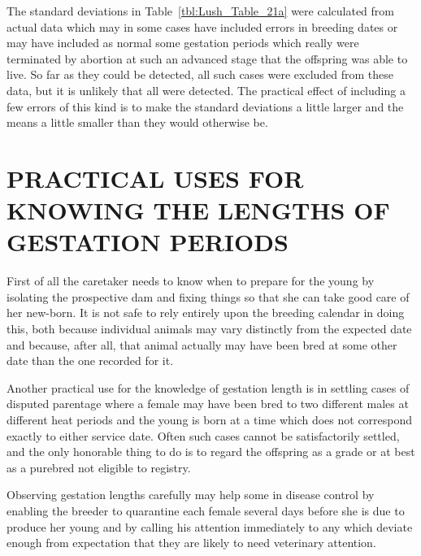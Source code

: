 The standard deviations in Table~\ref{tbl:Lush_Table_21a} were calculated
from actual data which may in some cases have included errors in breeding
dates or may have included as normal some gestation periods which really
were terminated by abortion at such an advanced stage that the offspring
was able to live. So far as they could be detected, all such cases
were excluded from these data, but it is unlikely that all were detected.
The practical effect of including a few errors of this kind is to make the
standard deviations a little larger and the means a little smaller than
they would otherwise be.

\section*{PRACTICAL USES FOR KNOWING THE LENGTHS OF GESTATION PERIODS}

First of all the caretaker needs to know when to prepare for the
young by isolating the prospective dam and fixing things so that she can
take good care of her new-born. It is not safe to rely entirely upon the
breeding calendar in doing this, both because individual animals may
vary distinctly from the expected date and because, after all, that animal
actually may have been bred at some other date than the one
recorded for it.

Another practical use for the knowledge of gestation length is in
settling cases of disputed parentage where a female may have been
bred to two different males at different heat periods and the young is
born at a time which does not correspond exactly to either service date.
Often such cases cannot be satisfactorily settled, and the only honorable
thing to do is to regard the offspring as a grade or at best as a purebred
not eligible to registry.

Observing gestation lengths carefully may help some in disease control
by enabling the breeder to quarantine each female several days
before she is due to produce her young and by calling his attention
immediately to any which deviate enough from expectation that they
are likely to need veterinary attention.